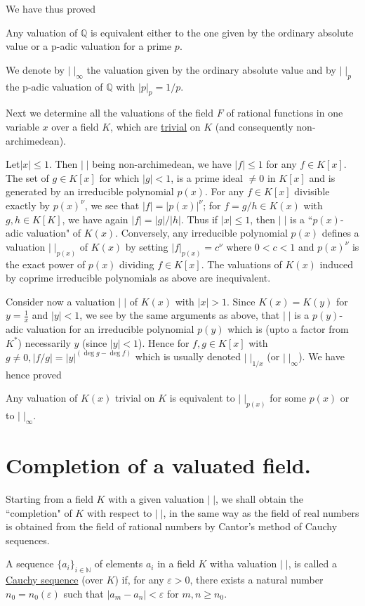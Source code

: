 We have thus proved
\begin{theorem}\label{thm:0.5}
Any valuation of $\mathbb{Q}$ is equivalent either to the one given by 
the ordinary absolute value or a p-adic valuation for a prime $p$.
\end{theorem}

We denote by $|\;|_\infty$ the valuation given by the ordinary absolute 
value and by $|\;|_p$ the p-adic valuation of $\mathbb{Q}$ with 
$|p|_p=1/p$.

Next we determine all the valuations of the field $F$ of rational 
functions in one variable $x$ over a field $K$, which are 
\underline{trivial} on $K$ (and consequently non-archimedean).

Let\pageoriginale $|x|\leq 1$. Then $|\;|$ being non-archimedean, we 
have $|f|\leq 1$ for any $f\in K[x]$. The set of $g\in K[x]$ for which 
$|g|< 1$, is a prime ideal $\neq 0$ in $K[x]$ and is generated by an 
irreducible polynomial $p(x)$. For any $f\in K[x]$ divisible exactly 
by $p(x)^\nu$, we see that $|f|=|p(x)|^\nu$; for $f=g/h\in K(x)$ with 
$g, h\in K[K]$, we have again $|f|=|g|/|h|$. Thus if $|x|\leq 1$, then 
$|\;|$ is a ``$p(x)$-adic valuation" of $K(x)$. Conversely, any 
irreducible polynomial $p(x)$ defines a valuation $|\;|_{p(x)}$ of 
$K(x)$ by setting $|f|_{p(x)}=c^\nu$ where $0<c<1$ and $p(x)^\nu$ is 
the exact power of $p(x)$ dividing $f\in K[x]$. The valuations of 
$K(x)$ induced by coprime irreducible polynomials as above are 
inequivalent. 

Consider now a valuation $|\;|$ of $K(x)$ with $|x|>1$. Since 
$K(x)=K(y)$ for $y=\frac{1}{x}$ and $|y|<1$, we see by the same 
arguments as above, that $|\;|$ is a $p(y)$-adic valuation for an 
irreducible polynomial $p(y)$ which is (upto a factor from $K^*$) 
necessarily $y$ (since $|y|<1$). Hence for $f, g\in K[x]$ with $g\neq 
0, |f/g|=|y|^{(\deg g-\deg f)}$ which is usually denoted $|\;|_{1/x}$ 
(or $|\;|_\infty$). We have hence proved 

\begin{theorem}\label{thm:0.6}
Any valuation of $K(x)$ trivial on $K$ is equivalent to $|\;|_{p(x)}$ 
for some $p(x)$ or to $|\;|_\infty$.
\end{theorem}

\section{Completion of a valuated field.}\label{sec0.4}
Starting from a field $K$ with a given valuation $|\;|$, we shall 
obtain the ``completion" of $K$ with respect to $|\;|$, in the same 
way as the field of real numbers is obtained from the field of 
rational numbers by Cantor's method of Cauchy sequences.
\begin{defi*}
A sequence $\{a_i\}_{i\in\mathbb{N}}$ of elements $a_i$ in a field $K$ 
with\pageoriginale a valuation $|\;|$, is called a \underline{Cauchy 
sequence} (over $K$) if, for any $\varepsilon >0$, there exists a 
natural number $n_0=n_0(\varepsilon)$ such that 
$|a_m-a_n|<\varepsilon$ for $m,n\geq n_0$. 
\end{defi*}

